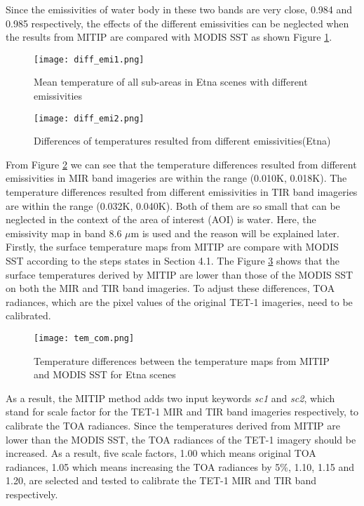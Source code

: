 \noindent Since the emissivities of water body in these two bands are very close, 0.984  and 0.985 respectively, the effects of the different emissivities can be neglected when the results from MITIP are compared with MODIS SST as shown Figure \ref{fig:tem_diff_emi1}.\\

\begin{figure}[!htbp]
\centering\texttt{[image: diff\_emi1.png]}
\caption{Mean temperature of all sub-areas in Etna scenes with different emissivities}
\label{fig:tem_diff_emi1}
\end{figure}

\begin{figure}[!htbp]
\centering\texttt{[image: diff\_emi2.png]}
\caption{Differences of temperatures resulted from different emissivities(Etna)}
\label{fig:tem_diff_emi2}
\end{figure}

\noindent From Figure \ref{fig:tem_diff_emi2} we can see that the temperature differences resulted from different emissivities in MIR band imageries are within the range (0.010K, 0.018K). The temperature differences resulted from different emissivities in TIR band imageries are within the range (0.032K, 0.040K). Both of them are so small that can be neglected in the context of the area of interest (AOI) is water. Here, the emissivity map in band 8.6 $\mu$m is used and the reason will be explained later.\\

\noindent Firstly, the surface temperature maps from MITIP are compare with MODIS SST according to the steps states in Section 4.1. The Figure \ref{fig:tem_com} shows that the surface temperatures derived by MITIP are lower than those of the MODIS SST on both the MIR and TIR band imageries. To adjust these differences, TOA radiances, which are the pixel values of the original TET-1 imageries, need to be calibrated.\\

\begin{figure}[!htbp]
\centering\texttt{[image: tem\_com.png]}
\caption{Temperature differences between the temperature maps from MITIP and MODIS SST for Etna scenes}
\label{fig:tem_com}
\end{figure}

\noindent As a result, the MITIP method adds two input keywords \emph{sc1} and \emph{sc2}, which stand for scale factor for the TET-1 MIR and TIR band imageries respectively, to calibrate the TOA radiances. Since the temperatures derived from MITIP are lower than the MODIS SST, the TOA radiances of the TET-1 imagery should be increased. As a result, five scale factors, 1.00 which means original TOA radiances, 1.05 which means increasing the TOA radiances by 5\%, 1.10, 1.15 and 1.20, are selected and tested to calibrate the TET-1 MIR and TIR band respectively.\\

